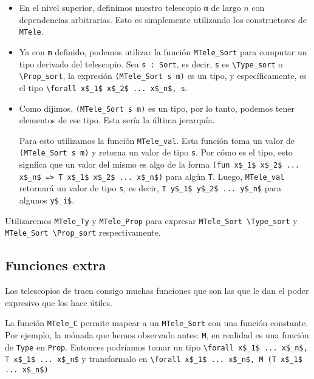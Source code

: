 \begin{itemize}
  \item En el nivel superior, definimos nuestro telescopio \lstinline{m} de largo $n$ con dependencias arbitrarias. Esto es simplemente utilizando los constructores de \lstinline{MTele}.
  \item Ya con \lstinline{m} definido, podemos utilizar la función \lstinline{MTele_Sort} para computar un tipo derivado del telescopio. Sea \lstinline{s : Sort}, es decir, \lstinline{s} es \lstinline{\Type_sort} o \lstinline{\Prop_sort}, la expresión \lstinline{(MTele_Sort s m)} es un tipo, y específicamente, es el tipo \lstinline{\forall x$_1$ x$_2$ ... x$_n$, s}.
  \item Como dijimos, \lstinline{(MTele_Sort s m)} es un tipo, por lo tanto, podemos tener elementos de ese tipo. Esta sería la última jerarquía.
  
  Para esto utilizamos la función \lstinline{MTele_val}. Esta función toma un valor de \lstinline{(MTele_Sort s m)} y retorna un valor de tipo \lstinline{s}. Por cómo es el tipo, esto signfica que un valor del mismo es algo de la forma \lstinline{(fun x$_1$ x$_2$ ... x$_n$ => T x$_1$ x$_2$ ... x$_n$)} para algún \lstinline{T}. Luego, \lstinline{MTele_val} retornará un valor de tipo \lstinline{s}, es decir, \lstinline{T y$_1$ y$_2$ ... y$_n$} para algunos \lstinline{y$_i$}.
\end{itemize}

Utilizaremos \lstinline{MTele_Ty} y \lstinline{MTele_Prop} para expresar \lstinline{MTele_Sort \Type_sort} y \lstinline{MTele_Sort \Prop_sort} respectivamente.

\subsection{Funciones extra}

Los telescopios de \Mtac traen consigo muchas funciones que son las que le dan el poder expresivo que los hace útiles. 

La función \lstinline{MTele_C} permite mapear a un \lstinline{MTele_Sort} con una función constante.
Por ejemplo, la mónada que hemos observado antes: \lstinline{M}, en realidad es una función de \lstinline{Type} en \lstinline{Prop}.
Entonces podríamos tomar un tipo \lstinline{\forall x$_1$ ... x$_n$, T x$_1$ ... x$_n$} y transformalo en \lstinline{\forall x$_1$ ... x$_n$, M (T x$_1$ ... x$_n$)}

